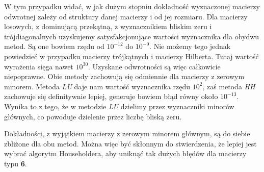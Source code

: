 W tym przypadku widać, w jak dużym stopniu dokładność wyznaczonej macierzy
odwrotnej zależy od struktury danej macierzy i od jej rozmiaru. Dla macierzy
losowych, z dominującą przekątną, z wyznacznikiem bliskim zeru i
trójdiagonalnych uzyskujemy satysfakcjonujące wartości wyznacznika dla obydwu
metod. Są one bowiem rzędu od
$10^{-12}$ do $10^{-9}$.
Nie możemy tego jednak powiedzieć w przypadku macierzy trójkątnych i macierzy
Hilberta. Tutaj wartość wyrażenia sięga nawet $10^{30}$. Uzyskane odwrotności są
więc
całkowicie niepoprawne. Obie metody zachowują się odmiennie dla macierzy z
zerowym minorem. Metoda \textit{LU} daje nam wartość wyznacznika rzędu $10^{2}$,
zaś metoda
\textit{HH} zachowuje się definitywnie lepiej, generuje bowiem błąd równy około
$10^{-13}$. Wynika to z tego, że w metodzie \textit{LU} dzielimy przez
wyznaczniki
minorów głównych, co powoduje dzielenie przez liczbę bliską zeru.

Dokładności, z wyjątkiem macierzy z zerowym minorem głównym, są do siebie
zbliżone dla obu metod. Można więc być skłonnym do stwierdzenia, że lepiej jest
wybrać
algorytm Householdera, aby uniknąć tak dużych błędów dla macierzy typu \textbf{6}.

